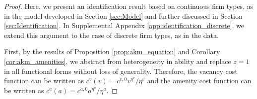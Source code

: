 %
\emph{%
    \PropFirmLevelParameters%
}%
%
\begin{proof}
    Here, we present an identification result based on continuous firm types, as in the model developed in Section \ref{sec:Model} and further discussed in Section \ref{sec:Identification}. In Supplemental Appendix \ref{app:identification_discrete}, we extend this argument to the case of discrete firm types, as in the data.

    First, by the results of Proposition \ref{prop:akm_equation} and Corollary \ref{cor:akm_amenities}, we abstract from heterogeneity in ability and replace $z=1$ in all functional forms without loss of generality. Therefore, the vacancy cost function can be written as $c^{v}(v) = c^{v,0} v^{\eta^{v}}/\eta^{v}$ and the amenity cost function can be written as $c^{a}(a) = c^{a,0} a^{\eta^{a}}/\eta^{a}$.


\end{proof}
